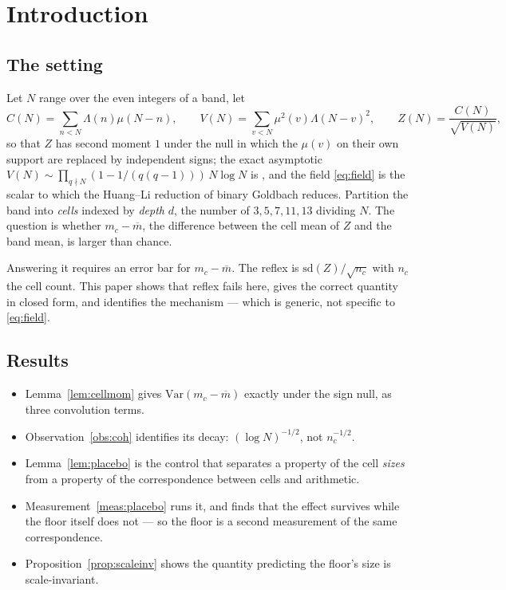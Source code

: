 \documentclass[11pt,a4paper]{article}
\theoremstyle{plain}
\theoremstyle{definition}
\theoremstyle{remark}
\begin{document}
\section{Introduction}

\subsection{The setting}

Let $N$ range over the even integers of a band, let
\begin{equation}\label{eq:field}
  C(N)=\sum_{n<N}\Lambda(n)\mu(N-n),
  \qquad
  V(N)=\sum_{v<N}\mu^2(v)\Lambda(N-v)^2,
  \qquad
  Z(N)=\frac{C(N)}{\sqrt{V(N)}},
\end{equation}
so that $Z$ has second moment $1$ under the null in which the $\mu(v)$
on their own support are replaced by independent signs; the exact
asymptotic $V(N)\sim\prod_{q\nmid N}(1-1/(q(q-1)))\,N\log N$ is
\cite[Prop.~1]{P3}, and the field \eqref{eq:field} is the scalar to
which the Huang--Li reduction of binary Goldbach \cite{HL} reduces.
Partition the
band into \emph{cells} indexed by \emph{depth} $d$, the number of
$3,5,7,11,13$ dividing $N$. The question is whether
$m_c-\overline m$, the difference between the cell mean of $Z$ and the
band mean, is larger than chance.

Answering it requires an error bar for $m_c-\overline m$. The reflex
is $\mathrm{sd}(Z)/\sqrt{n_c}$ with $n_c$ the cell count. This paper
shows that reflex fails here, gives the correct quantity in closed
form, and identifies the mechanism --- which is generic, not specific
to \eqref{eq:field}.

\subsection{Results}

\begin{itemize}
\item Lemma~\ref{lem:cellmom} gives $\mathrm{Var}(m_c-\overline m)$
exactly under the sign null, as three convolution terms.
\item Observation~\ref{obs:coh} identifies its decay: $(\log N)^{-1/2}$,
not $n_c^{-1/2}$.
\item Lemma~\ref{lem:placebo} is the control that separates a
property of the cell \emph{sizes} from a property of the
correspondence between cells and arithmetic.
\item Measurement~\ref{meas:placebo} runs it, and finds that the
effect survives while the floor itself does not --- so the floor is a
second measurement of the same correspondence.
\item Proposition~\ref{prop:scaleinv} shows the quantity predicting
the floor's size is scale-invariant.
\end{itemize}
\end{document}
